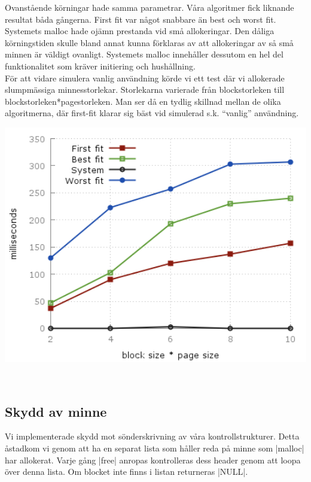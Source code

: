 \documentclass[paper=a4, fontsize=11pt]{scrartcl} %
\numberwithin{equation}{section} %
\numberwithin{figure}{section} %
\numberwithin{table}{section} %
\begin{document}
Ovanstående körningar hade samma parametrar.
Våra algoritmer fick liknande resultat båda gångerna.
First fit var något snabbare än best och worst fit.
Systemets malloc hade ojämn prestanda vid små allokeringar. 
Den dåliga körningstiden skulle bland annat kunna förklaras av att allokeringar
av så små minnen är väldigt ovanligt.
Systemets malloc innehåller dessutom en hel del funktionalitet som kräver
initiering och hushållning.\\

För att vidare simulera vanlig användning körde vi ett test där vi allokerade
slumpmässiga minnesstorlekar.
Storlekarna varierade från blockstorleken till blockstorleken*pagestorleken.
Man ser då en tydlig skillnad mellan de olika algoritmerna, där first-fit
klarar sig bäst vid simulerad s.k. ``vanlig'' användning.

\begin{minipage}{.5\textwidth}
    \centering
    \includegraphics[width=1\textwidth]{images/time_plot_rand.png}
    \label{fig:p3}
\end{minipage}\\



\subsection{Skydd av minne}

Vi implementerade skydd mot sönderskrivning av våra kontrollstrukturer. 
Detta åstadkom vi genom att ha en separat lista som håller reda på minne som
|malloc| har allokerat.
Varje gång |free| anropas kontrolleras dess header genom att loopa över denna
lista.
Om blocket inte finns i listan returneras |NULL|.
\end{document}
